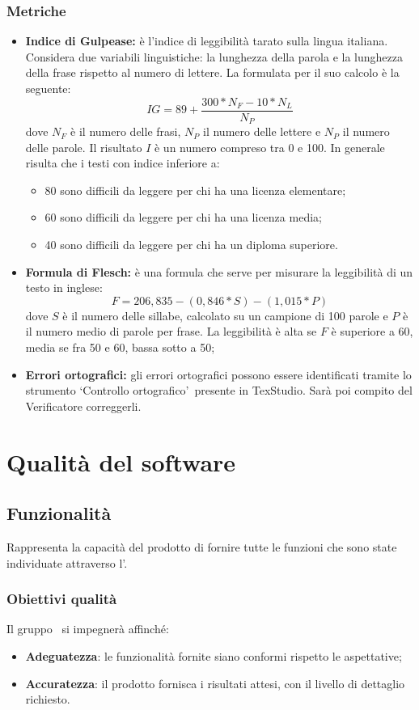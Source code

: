 \documentclass[PianoDiQualifica.tex]{subfiles}
\begin{document}
\subsubsection{Metriche}
\begin{itemize}
	\item \textbf{Indice di Gulpease:} è l'indice di leggibilità tarato sulla lingua italiana. Considera due variabili linguistiche: la lunghezza della parola e la lunghezza della frase rispetto al numero di lettere. La formulata per il suo calcolo è la seguente:
	\[IG=89+\dfrac{300*N_F-10*N_L}{N_P}\] dove $ N_F $ è il numero delle frasi, $ N_P $ il numero delle lettere e $ N_P $ il numero delle parole. Il risultato $I$ è un numero compreso tra 0 e 100. In generale risulta che i testi con indice inferiore a:
	\begin{itemize}
		\item 80 sono difficili da leggere per chi ha una licenza elementare;
		\item 60 sono difficili da leggere per chi ha una licenza media;
		\item 40 sono difficili da leggere per chi ha un diploma superiore.
	\end{itemize}	
	\item \textbf{Formula di Flesch:} è una formula che serve per misurare la leggibilità di un testo in inglese:
	\[F=206,835-(0,846*S)-(1,015*P)\] dove $ S $ è il numero delle sillabe, calcolato su un campione di 100 parole e $ P $ è il numero medio di parole per frase.
	La leggibilità è alta se $F$ è superiore a 60, media se fra 50 e 60, bassa sotto a 50;
	\item \textbf{Errori ortografici:} gli errori ortografici possono essere identificati tramite lo strumento \textquoteleft Controllo ortografico\textquoteright\ presente in TexStudio. Sarà poi compito del Verificatore correggerli.  	
\end{itemize}
		
\section{Qualità del software}
\subsection{Funzionalità}
Rappresenta la capacità del prodotto di fornire tutte le funzioni che sono state individuate attraverso l'\adr.	
\subsubsection{Obiettivi qualità}
Il gruppo \gruppo\ si impegnerà affinché:
\begin{itemize}
	\item \textbf{Adeguatezza}: le funzionalità fornite siano conformi rispetto le aspettative;
	\item \textbf{Accuratezza}: il prodotto fornisca i risultati attesi, con il livello di dettaglio richiesto. 
\end{itemize}	
\end{document}
